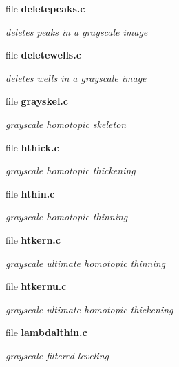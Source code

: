 \begin{CompactItemize}
\item 
file \bf{deletepeaks.c}
\begin{CompactList}\small\item\em deletes peaks in a grayscale image \item\end{CompactList}

\item 
file \bf{deletewells.c}
\begin{CompactList}\small\item\em deletes wells in a grayscale image \item\end{CompactList}

\item 
file \bf{grayskel.c}
\begin{CompactList}\small\item\em grayscale homotopic skeleton \item\end{CompactList}

\item 
file \bf{hthick.c}
\begin{CompactList}\small\item\em grayscale homotopic thickening \item\end{CompactList}

\item 
file \bf{hthin.c}
\begin{CompactList}\small\item\em grayscale homotopic thinning \item\end{CompactList}

\item 
file \bf{htkern.c}
\begin{CompactList}\small\item\em grayscale ultimate homotopic thinning \item\end{CompactList}

\item 
file \bf{htkernu.c}
\begin{CompactList}\small\item\em grayscale ultimate homotopic thickening \item\end{CompactList}

\item 
file \bf{lambdalthin.c}
\begin{CompactList}\small\item\em grayscale filtered leveling \item\end{CompactList}


\end{CompactItemize}
